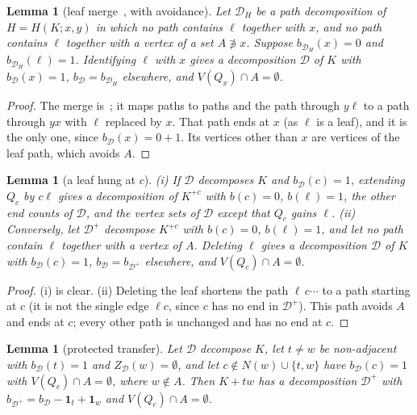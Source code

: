 \documentclass[11pt]{amsart}
\newtheorem{lemma}[theorem]{Lemma}
\theoremstyle{definition}
\newcommand{\cD}{\mathcal D}
\begin{document}
\begin{lemma}[leaf merge~{\cite[Lemma~12]{MS}}, with avoidance]\label{lem:merge}
Let $\cD_H$ be a path decomposition of $H=H(K;x,y)$ in which no path contains $\ell$ together with
$x$, and no path contains $\ell$ together with a vertex of a set $A\not\ni x$. Suppose $b_{\cD_H}(x)=0$
and $b_{\cD_H}(\ell)=1$. Identifying $\ell$ with $x$ gives a decomposition $\cD$ of $K$ with
$b_\cD(x)=1$, $b_\cD=b_{\cD_H}$ elsewhere, and $V(Q_x)\cap A=\emptyset$.
\end{lemma}

\begin{proof}
The merge is~\cite[Lemma~12]{MS}; it maps paths to paths and the path through $y\ell$ to a path
through $yx$ with $\ell$ replaced by $x$. That path ends at $x$ (as $\ell$ is a leaf), and it is the
only one, since $b_\cD(x)=0+1$. Its vertices other than $x$ are vertices of the leaf path, which
avoids $A$.
\end{proof}

\begin{lemma}[a leaf hung at $c$]\label{lem:hang}
\emph{(i)} If $\cD$ decomposes $K$ and $b_\cD(c)=1$, extending $Q_c$ by $c\ell$ gives a
decomposition of $K^{+c}$ with $b(c)=0$, $b(\ell)=1$, the other end counts of $\cD$, and the vertex
sets of $\cD$ except that $Q_c$ gains $\ell$. \emph{(ii)} Conversely, let $\cD^+$ decompose $K^{+c}$
with $b(c)=0$, $b(\ell)=1$, and let no path contain $\ell$ together with a vertex of $A$. Deleting
$\ell$ gives a decomposition $\cD$ of $K$ with $b_\cD(c)=1$, $b_\cD=b_{\cD^+}$ elsewhere, and
$V(Q_c)\cap A=\emptyset$.
\end{lemma}

\begin{proof}
(i) is clear. (ii) Deleting the leaf shortens the path $\ell\,c\cdots$ to a path starting at $c$
(it is not the single edge $\ell c$, since $c$ has no end in $\cD^+$). This path avoids $A$ and ends
at $c$; every other path is unchanged and has no end at $c$.
\end{proof}

\begin{lemma}[protected transfer]\label{lem:protect}
Let $\cD$ decompose $K$, let $t\ne w$ be non-adjacent with $b_\cD(t)=1$ and $Z_\cD(w)=\emptyset$, and
let $c\notin N(w)\cup\{t,w\}$ have $b_\cD(c)=1$ with $V(Q_c)\cap A=\emptyset$, where $w\notin A$. Then
$K+tw$ has a decomposition $\cD^+$ with $b_{\cD^+}=b_\cD-\mathbf 1_t+\mathbf 1_w$ and
$V(Q_c)\cap A=\emptyset$.
\end{lemma}
\end{document}
